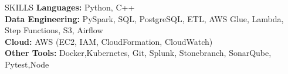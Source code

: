 \documentclass[10pt]{resume}
\begin{document}
\begin{rSection}{SKILLS}
\textbf{Languages:} Python, C++ \\
\textbf{Data Engineering:} PySpark, SQL, PostgreSQL, ETL, AWS Glue, Lambda, Step Functions, S3, Airflow \\
\textbf{Cloud:} AWS (EC2, IAM, CloudFormation, CloudWatch) \\
\textbf{Other Tools:} Docker,Kubernetes, Git, Splunk, Stonebranch, SonarQube, Pytest,Node
\end{rSection}
\end{document}
